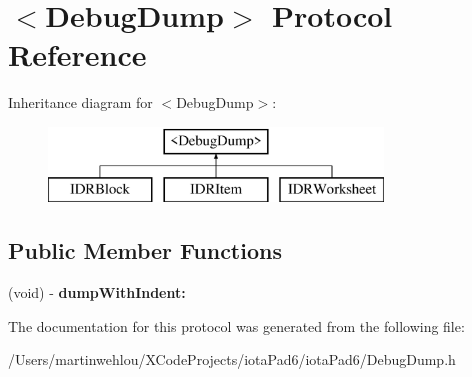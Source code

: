 \hypertarget{protocol_debug_dump-p}{
\section{$<$DebugDump$>$ Protocol Reference}
\label{protocol_debug_dump-p}
}
Inheritance diagram for $<$DebugDump$>$:\begin{figure}[H]
\begin{center}
\leavevmode
\includegraphics[height=2.000000cm]{protocol_debug_dump-p}
\end{center}
\end{figure}
\subsection*{Public Member Functions}
\begin{DoxyCompactItemize}
\item 
\hypertarget{protocol_debug_dump-p_ac47f80faed83b015d5ce6b398b9896f2}{
(void) -\/ {\bfseries dumpWithIndent:}}
\label{protocol_debug_dump-p_ac47f80faed83b015d5ce6b398b9896f2}

\end{DoxyCompactItemize}


The documentation for this protocol was generated from the following file:\begin{DoxyCompactItemize}
\item 
/Users/martinwehlou/XCodeProjects/iotaPad6/iotaPad6/DebugDump.h\end{DoxyCompactItemize}
